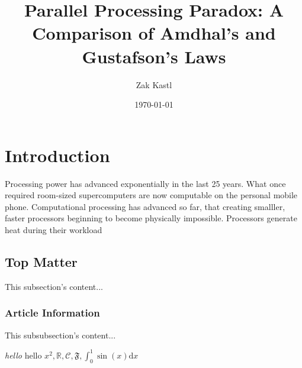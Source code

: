 \documentclass{article}
\begin{document}
\title{Parallel Processing Paradox: A Comparison of Amdhal's and Gustafson's Laws}
\author{Zak Kastl}
\date{\today}
\maketitle

\section{Introduction}
Processing power has advanced exponentially in the last 25 years. What once required room-sized supercomputers are now computable on the personal mobile phone. Computational processing has advanced so far, that creating smalller, faster processors beginning to become physically impossible. Processors generate heat during their workload

\subsection{Top Matter}
This subsection's content...

\subsubsection{Article Information}
This subsubsection's content...

\emph{hello} hello $x^2, \mathbb R, \mathcal C, \mathfrak F, \int_0^1 \sin(x) \mathrm d x$
\end{document}
